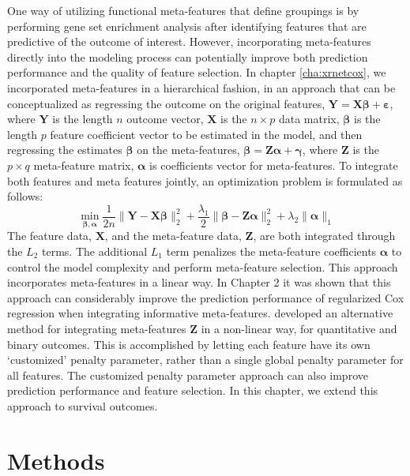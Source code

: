 One way of utilizing functional meta-features that define groupings is by performing gene set enrichment analysis \citep{subramanian2005gene} after identifying features that are predictive of the outcome of interest. However, incorporating meta-features directly into the modeling process can potentially improve both prediction performance and the quality of feature selection. In chapter \ref{cha:xrnetcox}, we incorporated  meta-features in a hierarchical fashion, in an approach that can be conceptualized as regressing the outcome on the original features, 
$ \bm{Y} = \bm{X\beta} + \bm{\varepsilon} $, 
where $\bm{Y}$ is the length $n$ outcome vector, $\bm{X}$ is the $n \times p$ data matrix, $\bm{\beta}$ is the length $p$ feature coefficient vector to be estimated in the model, and then regressing the estimates $\bm{\beta}$ on the meta-features, $\bm{\beta} = \bm{Z\alpha} + \bm{\gamma}$, where $\bm{Z}$ is the $p \times q$ meta-feature matrix, $\bm{\alpha}$ is coefficients vector for meta-features. To integrate both features and meta features jointly, an optimization problem is formulated as follows: 
$$ \min_{\bm{\beta, \alpha}} \frac{1}{2n} \|\bm{Y}-\bm{X \beta} \|_2^2 + \frac{\lambda_1}{2} \|\bm{\beta} - \bm{Z \alpha} \|_2^2 + \lambda_2 \|\bm{\alpha}\|_1 $$
The feature data, $\bm{X}$, and the meta-feature data, $\bm{Z}$, are both integrated  through the $L_2$ terms. The additional $L_1$ term penalizes the meta-feature coefficients $\bm{\alpha}$ to control the model complexity and perform meta-feature selection. This approach incorporates meta-features in a linear way. In Chapter 2 it was shown that this approach can considerably improve the prediction performance of regularized Cox regression  when integrating informative meta-features. \cite{zeng2021incorporating} developed an alternative method for integrating meta-features $\bm{Z}$ in a non-linear way, for quantitative and binary outcomes. This is accomplished by letting each feature have its own `customized' penalty parameter, rather than a single global penalty parameter for all features. The customized penalty parameter approach can also improve prediction performance and feature selection. In this chapter, we extend this approach to survival outcomes. 

\section{Methods}
